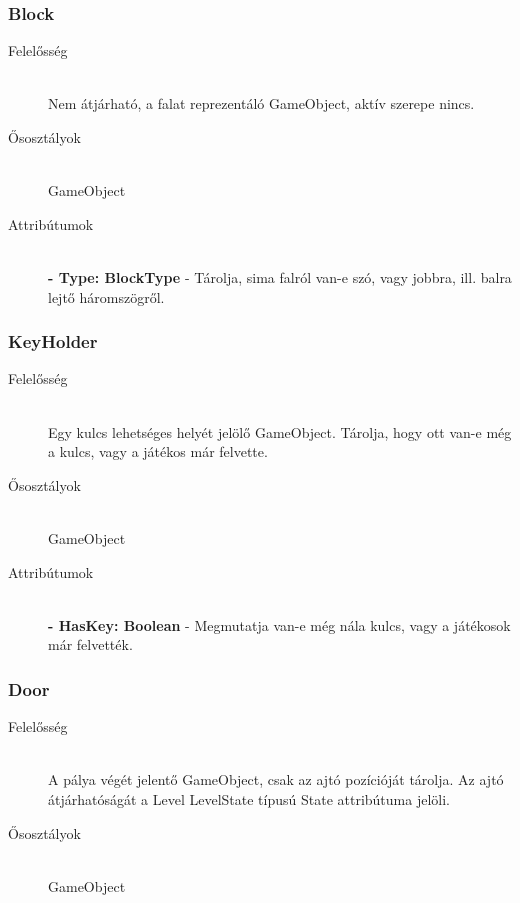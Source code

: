 \subsubsection{Block}
	\begin{description}
		\item[Felelősség] \hfill \\
		Nem átjárható, a falat reprezentáló GameObject, aktív szerepe nincs.
		
		\item[Ősosztályok]\hfill \\
		GameObject

		\item[Attribútumok] \hfill \\
		\textbf{- Type: BlockType} - Tárolja, sima falról van-e szó, vagy jobbra, ill. balra lejtő háromszögről.
						
	\end{description}
		
\subsubsection{KeyHolder}
	\begin{description}
		\item[Felelősség] \hfill \\
		Egy kulcs lehetséges helyét jelölő GameObject. Tárolja, hogy ott van-e még a kulcs, vagy a játékos már felvette.
		
		\item[Ősosztályok]\hfill \\
		GameObject
		
		\item[Attribútumok]\hfill \\
		\textbf{- HasKey: Boolean} - Megmutatja van-e még nála kulcs, vagy a játékosok már felvették.

	\end{description}
	
\subsubsection{Door}
	\begin{description}
		\item[Felelősség] \hfill \\
		A pálya végét jelentő GameObject, csak az ajtó pozícióját tárolja. Az ajtó átjárhatóságát a Level LevelState típusú State attribútuma jelöli.
		
		\item[Ősosztályok]\hfill \\
		GameObject
						
	\end{description}
	
